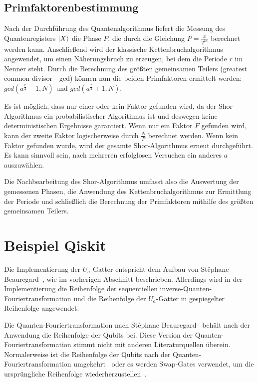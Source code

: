 \documentclass[a4paper,journal]{IEEEtran}
\begin{document}
\subsection{Primfaktorenbestimmung}
Nach der Durchführung des Quantenalgorithmus liefert die Messung des Quantenregisters \(\ket{X}\) die Phase \(P\),
die durch die Gleichung \(P = \frac{x}{2^{2n}}\) berechnet werden kann.
Anschließend wird der klassische Kettenbruchalgorithmus angewendet,
um einen Näherungsbruch zu erzeugen, bei dem die Periode \(r\) im Nenner steht.
Durch die Berechnung des größten gemeinsamen Teilers (greatest common divisor - gcd)
können nun die beiden Primfaktoren ermittelt werden:
\(gcd(a^{\frac{r}{2}}-1, N)\) und \(gcd(a^{\frac{r}{2}}+1, N)\).

Es ist möglich, dass nur einer oder kein Faktor gefunden wird,
da der Shor-Algorithmus ein probabilistischer Algorithmus ist und
deswegen keine deterministischen Ergebnisse garantiert.
Wenn nur ein Faktor \(F\) gefunden wird,
kann der zweite Faktor logischerweise durch \(\frac{N}{F}\) berechnet werden.
Wenn kein Faktor gefunden wurde, wird der gesamte Shor-Algorithmus erneut durchgeführt.
Es kann sinnvoll sein, nach mehreren erfolglosen Versuchen ein anderes \(a\) auszuwählen.~\cite{Mounica}

Die Nachbearbeitung des Shor-Algorithmus umfasst also die Auswertung der gemessenen Phasen,
die Anwendung des Kettenbruchalgorithmus zur Ermittlung der Periode und
schließlich die Berechnung der Primfaktoren mithilfe des größten gemeinsamen Teilers.

\section{Beispiel Qiskit}
Die Implementierung der \(U_a\)-Gatter entspricht dem Aufbau von
Stêphane Beauregard~\cite{beauregard2003circuit},
wie im vorherigen Abschnitt beschrieben.
Allerdings wird in der Implementierung die Reihenfolge
der sequentiellen inverse-Quanten-Fouriertransformation und
die Reihenfolge der \(U_a\)-Gatter in gespiegelter Reihenfolge angewendet.

Die Quanten-Fouriertransformation nach
Stêphane Beauregard~\cite{beauregard2003circuit} behält
nach der Anwendung die Reihenfolge der Qubits bei.
Diese Version der Quanten-Fouriertransformation stimmt nicht
mit anderen Literaturquellen überein.
Normalerweise ist die Reihenfolge der Qubits
nach der Quanten-Fouriertransformation umgekehrt~\cite{Hoever:QC,Young:QFT} oder
es werden Swap-Gates verwendet,
um die ursprüngliche Reihenfolge wiederherzustellen~\cite{IBM:QFT}.
\end{document}
